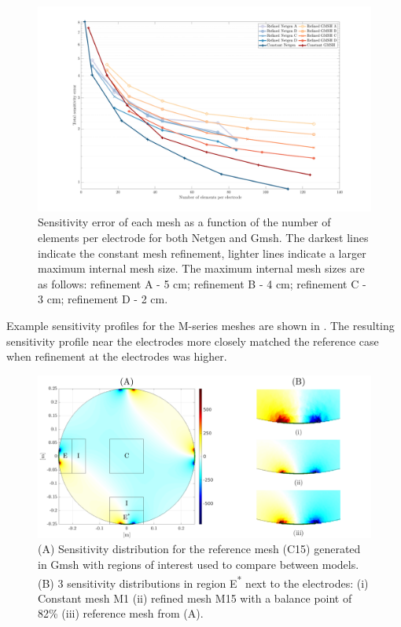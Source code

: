 \begin{figure}
  \includegraphics[width=\columnwidth]{chapter4-mesh_refinement/imgs/sens_error_total.pdf}
  \caption[Mesh sensitivity error vs. elements per electrode]{\label{fig:results_sens_original} Sensitivity error of each mesh as a function 
  of the number of elements per electrode for both Netgen and Gmsh. The darkest lines indicate the
  constant mesh refinement, lighter lines indicate a larger maximum internal mesh size. The maximum
  internal mesh sizes are as follows: refinement A - 5 cm; refinement B - 4 cm; refinement C - 3 cm;
  refinement D - 2 cm.}
\end{figure}


Example sensitivity profiles for the M-series meshes are shown in .
The resulting sensitivity profile near the electrodes more closely matched the reference case 
when refinement at the electrodes was higher. 

\begin{figure}
  \includegraphics[width=\columnwidth]{chapter4-mesh_refinement/imgs/roi_methods_figure.pdf}
  \caption[Sensitivity distribution and regions of interest]{\label{fig:roiMethods} (A) Sensitivity distribution for the reference mesh
  (C15) generated in Gmsh with regions of interest used to compare between models. 
  (B) 3 sensitivity distributions in region E\textsuperscript{*} next to the electrodes: (i) Constant mesh M1
  (ii) refined mesh M15 with a balance point of 82\% (iii) reference mesh from (A).
  }
\end{figure}

